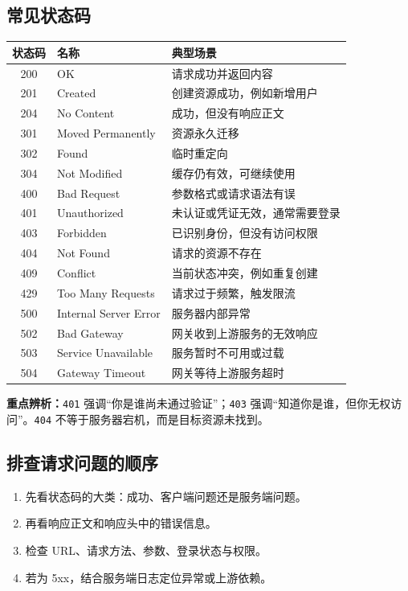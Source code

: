\documentclass[11pt,a4paper]{ctexart}
\begin{document}
\subsection{常见状态码}

\begin{tabularx}{\textwidth}{c l X}
\toprule
状态码 & 名称 & 典型场景 \\
\midrule
200 & OK & 请求成功并返回内容 \\
201 & Created & 创建资源成功，例如新增用户 \\
204 & No Content & 成功，但没有响应正文 \\
301 & Moved Permanently & 资源永久迁移 \\
302 & Found & 临时重定向 \\
304 & Not Modified & 缓存仍有效，可继续使用 \\
400 & Bad Request & 参数格式或请求语法有误 \\
401 & Unauthorized & 未认证或凭证无效，通常需要登录 \\
403 & Forbidden & 已识别身份，但没有访问权限 \\
404 & Not Found & 请求的资源不存在 \\
409 & Conflict & 当前状态冲突，例如重复创建 \\
429 & Too Many Requests & 请求过于频繁，触发限流 \\
500 & Internal Server Error & 服务器内部异常 \\
502 & Bad Gateway & 网关收到上游服务的无效响应 \\
503 & Service Unavailable & 服务暂时不可用或过载 \\
504 & Gateway Timeout & 网关等待上游服务超时 \\
\bottomrule
\end{tabularx}

\textbf{重点辨析：}\texttt{401} 强调“你是谁尚未通过验证”；\texttt{403} 强调“知道你是谁，但你无权访问”。\texttt{404} 不等于服务器宕机，而是目标资源未找到。

\subsection{排查请求问题的顺序}

\begin{enumerate}
  \item 先看状态码的大类：成功、客户端问题还是服务端问题。
  \item 再看响应正文和响应头中的错误信息。
  \item 检查 URL、请求方法、参数、登录状态与权限。
  \item 若为 5xx，结合服务端日志定位异常或上游依赖。
\end{enumerate}
\end{document}
